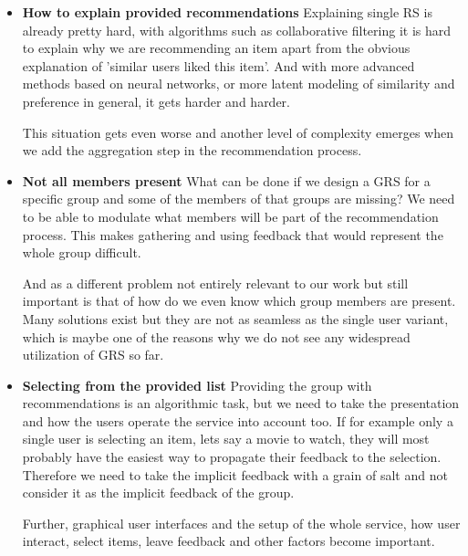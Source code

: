 \begin{itemize}
    \item \textbf{How to explain provided recommendations} \newline
    Explaining single RS is already pretty hard, with algorithms such as collaborative filtering it is hard to explain why we are recommending an item apart from the obvious explanation of 'similar users liked this item'. And with more advanced methods based on neural networks, or more latent modeling of similarity and preference in general, it gets harder and harder.
    
    This situation gets even worse and another level of complexity emerges when we add the aggregation step in the recommendation process. 
    
    \item \textbf{Not all members present} \newline
    What can be done if we design a GRS for a specific group and some of the members of that groups are missing? We need to be able to modulate what members will be part of the recommendation process. This makes gathering and using feedback that would represent the whole group difficult.
    
    And as a different problem not entirely relevant to our work but still important is that of how do we even know which group members are present. Many solutions exist but they are not as seamless as the single user variant, which is maybe one of the reasons why we do not see any widespread utilization of GRS so far.
    
    \item \textbf{Selecting from the provided list} \newline
    Providing the group with recommendations is an algorithmic task, but we need to take the presentation and how the users operate the service into account too. If for example only a single user is selecting an item, lets say a movie to watch, they will most probably have the easiest way to propagate their feedback to the selection. Therefore we need to take the implicit feedback with a grain of salt and not consider it as the implicit feedback of the group.
    
    Further, graphical user interfaces and the setup of the whole service, how user interact, select items, leave feedback and other factors become important.
    
\end{itemize}



